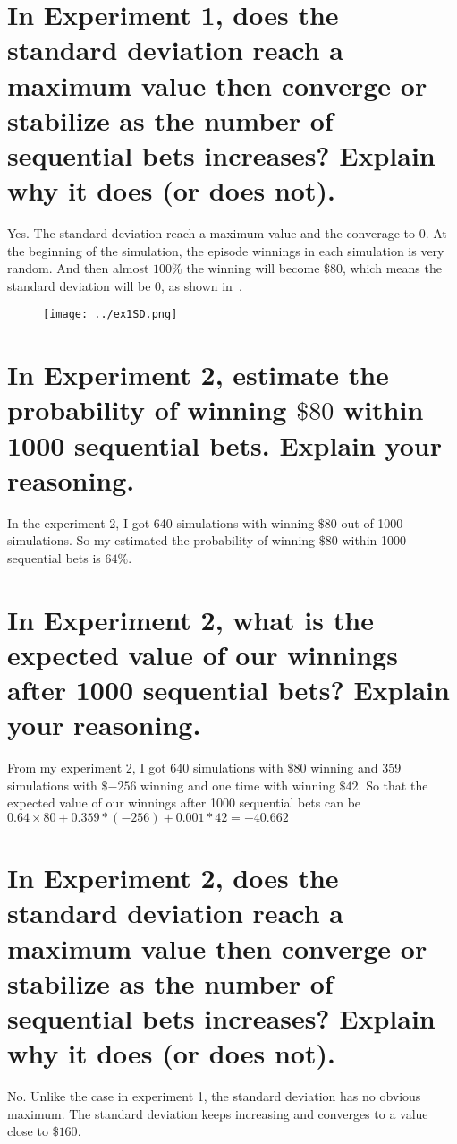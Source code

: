 \documentclass{svproc}
\begin{document}

\section{In Experiment 1, does the standard deviation reach a maximum value then converge or stabilize as the number of sequential bets increases? Explain why it does (or does
not).}\label{sec3}
Yes. The standard deviation reach a maximum value and the converage to 0. At the beginning of the simulation, the episode winnings in each simulation is very random. And then almost $100\%$ the winning will become $\$80$, which means the standard deviation will be 0, as shown in~\cite{fig1}.

\begin{figure}[ht!]
    \centering
            \centering
        \texttt{[image: ../ex1SD.png]}
        \label{fig1}
\end{figure}

\section{In Experiment 2, estimate the probability of winning $\$80$ within 1000 sequential bets. Explain your
reasoning.}\label{sec4}
In the experiment 2, I got 640 simulations with winning $\$80$ out of 1000 simulations. 
So my estimated the probability of winning $\$80$ within 1000 sequential bets is $64\%$. 


\section{In Experiment 2, what is the expected value of our winnings after 1000 sequential bets? Explain your reasoning.}\label{sec5}
From my experiment 2, I got 640 simulations with $\$80$ winning and 359 simulations with $\${-256}$ winning and one time with winning $\$42$. 
So that the expected value of our winnings after 1000 sequential bets can be $0.64\times80+0.359*({-256})+0.001*42 = {-40.662}$


\section{In Experiment 2, does the standard deviation reach a maximum value then converge or stabilize as the number of sequential bets increases? Explain why it does (or does not).}\label{sec6}
No. Unlike the case in experiment 1, the standard deviation has no obvious maximum. The standard deviation keeps increasing and converges to a value close to $\$160$.
\end{document}
